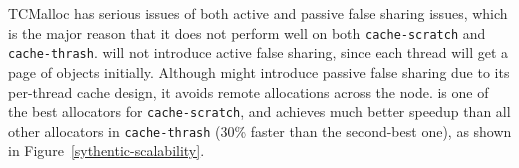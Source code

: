 TCMalloc has serious issues of both active and passive false sharing issues, which is the major reason that it does not perform well on both \texttt{cache-scratch} and \texttt{cache-thrash}. 
\NM{} will not introduce active false sharing, since each thread will get a page of objects initially. Although \NM{} might introduce passive false sharing due to its per-thread cache design, it avoids remote allocations across the node. 
 \NM{} is one of the best allocators for \texttt{cache-scratch}, and achieves much better speedup than all other allocators in \texttt{cache-thrash} (30\% faster than the second-best one), as shown in Figure~\ref{sythentic-scalability}. 
 





